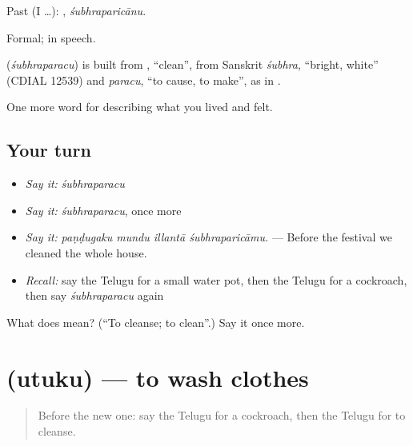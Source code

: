 Past (I …): , \emph{śubhraparicānu}.

Formal;   in speech.

\begin{cousinweb}
\textbf{} (\emph{śubhraparacu}) is built from , \textquotedblleft{}clean\textquotedblright{}, from Sanskrit \emph{śubhra}, \textquotedblleft{}bright, white\textquotedblright{} (CDIAL 12539) and \emph{paracu}, \textquotedblleft{}to cause, to make\textquotedblright{}, as in .
\end{cousinweb}

\begin{grammarlens}[title={What you've built}]
One more word for describing what you lived and felt.
\end{grammarlens}

\subsection*{Your turn}
\begin{itemize}
\raggedright
  \item \emph{Say it:} \emph{śubhraparacu}
  \item \emph{Say it:} \emph{śubhraparacu}, once more
  \item \emph{Say it:} \emph{paṇḍugaku mundu illantā śubhraparicāmu.} — Before the festival we cleaned the whole house.
  \item \emph{Recall:} say the Telugu for a small water pot, then the Telugu for a cockroach, then say \emph{śubhraparacu} again
\end{itemize}

\begin{tcolorbox}[breakable,colback=teal!4,colframe=teal!35!black,title={Before you move on}]
What does  mean? (\textquotedblleft{}To cleanse; to clean\textquotedblright{}.) Say it once more.
\end{tcolorbox}
\section[\texorpdfstring{\te{ఉతుకు} (utuku)}{ఉతుకు (utuku)}]{ (utuku) — to wash clothes}

\label{lesson:TE-C547-utuku}



\begin{quote}
Before the new one: say the Telugu for a cockroach, then the Telugu for to cleanse.
\end{quote}

